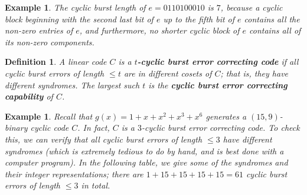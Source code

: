 \documentclass[10pt]{article}
\theoremstyle{newstyle}
\newtheorem{defn}[thm]{Definition}
\newtheorem{exmp}[thm]{Example}
\begin{document}
\begin{exmp}
The cyclic burst length of $e = 0110100010$ is $7$, because a cyclic block beginning with the second last
bit of $e$ up to the fifth bit of $e$ contains all the non-zero entries of $e$, and furthermore, 
no shorter cyclic block of $e$ contains all of its non-zero components. 
\end{exmp}

\begin{defn}
A linear code $C$ is a {\bf $t$-cyclic burst error correcting code} if all cyclic burst 
errors of length $\leq t$ are in different cosets of $C$; that is, they have different syndromes. 
The largest such $t$ is the {\bf cyclic burst error correcting capability} of $C$. 
\end{defn}

\begin{exmp}
Recall that $g(x) = 1+x+x^2+x^3+x^6$ generates a $(15, 9)$-binary cyclic code $C$. In fact, 
$C$ is a $3$-cyclic burst error correcting code. To check this, we can verify that 
all cyclic burst errors of length $\leq 3$ have different syndromes (which is extremely 
tedious to do by hand, and is best done with a computer program). In the following table, 
we give some of the syndromes and their integer representations; there are 
$1 + 15 + 15 + 15 + 15 = 61$ cyclic burst errors of length $\leq 3$ in total. 


\end{exmp}
\end{document}
